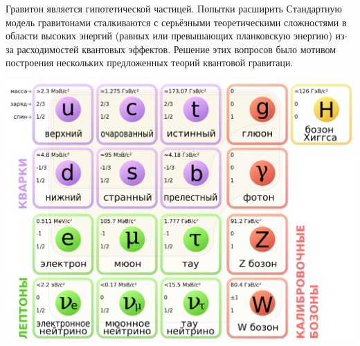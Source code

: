 \documentclass[a4paper,14pt]{article}
\begin{document}
Гравитон является гипотетической частицей. Попытки расширить Стандартную модель гравитонами сталкиваются с серьёзными теоретическими сложностями в области высоких энергий (равных или превышающих планковскую энергию) из-за расходимостей квантовых эффектов. Решение этих вопросов было мотивом построения нескольких предложенных теорий квантовой гравитаци.

\includegraphics[width=1\textwidth]{basic_particles.png}
\end{document}
